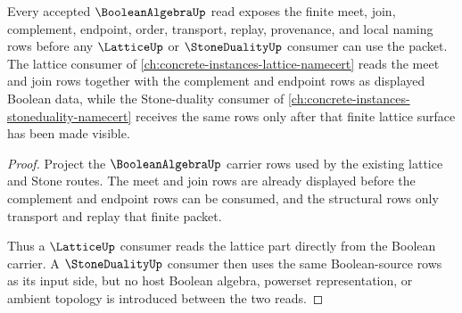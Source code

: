 \begin{theorem}
\label{thm:boolean-algebra-lattice-dependency-route}
Every accepted $\BooleanAlgebraUp$ read exposes the finite meet, join, complement, endpoint, order, transport, replay, provenance, and local naming rows before any $\LatticeUp$ or $\StoneDualityUp$ consumer can use the packet. The lattice consumer of \autoref{ch:concrete-instances-lattice-namecert} reads the meet and join rows together with the complement and endpoint rows as displayed Boolean data, while the Stone-duality consumer of \autoref{ch:concrete-instances-stoneduality-namecert} receives the same rows only after that finite lattice surface has been made visible.
\end{theorem}
\begin{proof}
Project the $\BooleanAlgebraUp$ carrier rows used by the existing lattice and Stone routes. The meet and join rows are already displayed before the complement and endpoint rows can be consumed, and the structural rows only transport and replay that finite packet.

Thus a $\LatticeUp$ consumer reads the lattice part directly from the Boolean carrier. A $\StoneDualityUp$ consumer then uses the same Boolean-source rows as its input side, but no host Boolean algebra, powerset representation, or ambient topology is introduced between the two reads.
\end{proof}
